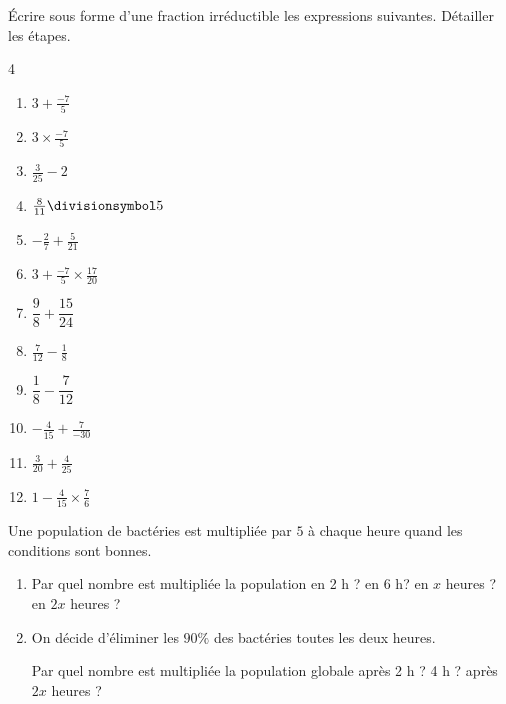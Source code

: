 \documentclass[main.tex]{subfiles}
\begin{document}
\begin{exercise}[\cancel{\faCalculator}] Écrire sous forme d'une fraction irréductible les expressions suivantes. Détailler les étapes.
	
	\begin{multicols}{4}
		\begin{enumerate}[label={$\Alph*=$\rule{0pt}{1.8em}},leftmargin=*] 
			\item $ 3+ \frac{-7}{5}$
			\item $ 3\times \frac{-7}{5}$
			\item $  \frac{3}{25} - 2$ 
			\item $\frac{8}{11}\divisionsymbol 5$ 
			\item $ -\frac{2}{7}+\frac{5}{21}$
			\item $ 3+ \frac{-7}{5} \times \frac{17}{20}$
			\item $  \dfrac{9}{8} +\dfrac{15}{24}$
			\item $ \frac{7}{12}-\frac{1}{8}$ 
			\item $\dfrac{1}{8}-\dfrac{7}{12}$ 
			\item $ -\frac{4}{15}  +\frac{7}{-30} $ 
			\item $ \frac{3}{20}+\frac{4}{25}$ 
			\item 	$  1- \frac{4}{15}\times\frac{7}{6}$   
		\end{enumerate}
	\end{multicols}
\end{exercise} 

\begin{exercise} 
	Une population de bactéries est multipliée par $5$ à chaque heure quand les conditions sont bonnes.
	\begin{enumerate}[label=\arabic*),leftmargin=*]
		\item Par quel nombre est multipliée la population en  2 h ? en 6 h? en $x$ heures ? en $2x$ heures ?
		\item On décide d'éliminer les $90\%$ des bactéries toutes les deux heures.  
		
		 Par quel nombre est multipliée la population globale après 2 h ? 4 h ? après $2x$ heures ? 
	\end{enumerate}  
\end{exercise}

% 
\end{document}
